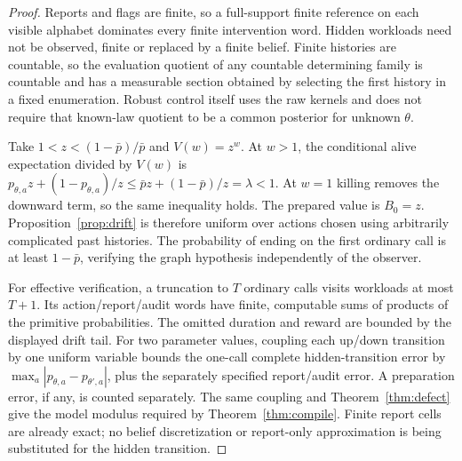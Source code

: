 \begin{proof}
Reports and flags are finite, so a full-support finite reference on each visible alphabet dominates every finite intervention word. Hidden workloads need not be observed, finite or replaced by a finite belief. Finite histories are countable, so the evaluation quotient of any countable determining family is countable and has a measurable section obtained by selecting the first history in a fixed enumeration. Robust control itself uses the raw kernels and does not require that known-law quotient to be a common posterior for unknown $\theta$.

Take $1<z<(1-\bar p)/\bar p$ and $V(w)=z^w$. At $w>1$, the conditional alive expectation divided by $V(w)$ is
$p_{\theta,a}z+(1-p_{\theta,a})/z\le\bar p z+(1-\bar p)/z=\lambda<1$.
At $w=1$ killing removes the downward term, so the same inequality holds. The prepared value is $B_0=z$. Proposition~\ref{prop:drift} is therefore uniform over actions chosen using arbitrarily complicated past histories. The probability of ending on the first ordinary call is at least $1-\bar p$, verifying the graph hypothesis independently of the observer.

For effective verification, a truncation to $T$ ordinary calls visits workloads at most $T+1$. Its action/report/audit words have finite, computable sums of products of the primitive probabilities. The omitted duration and reward are bounded by the displayed drift tail. For two parameter values, coupling each up/down transition by one uniform variable bounds the one-call complete hidden-transition error by $\max_a|p_{\theta,a}-p_{\theta',a}|$, plus the separately specified report/audit error. A preparation error, if any, is counted separately. The same coupling and Theorem~\ref{thm:defect} give the model modulus required by Theorem~\ref{thm:compile}. Finite report cells are already exact; no belief discretization or report-only approximation is being substituted for the hidden transition.


\end{proof}
